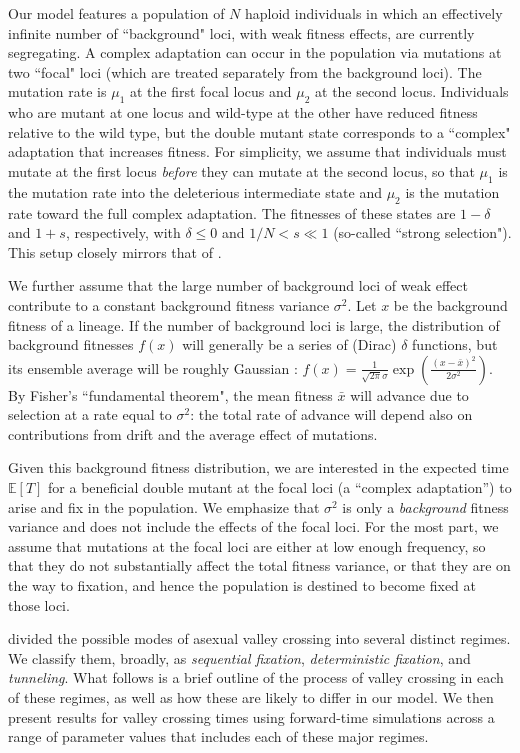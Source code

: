 \documentclass[10pt,twocolumn,twoside]{gsajnl}
\begin{document}
\begin{spacing}{1.5}
Our model features a population of $N$ haploid individuals in which an effectively infinite number of ``background" loci, with weak fitness effects, are currently segregating.
A complex adaptation can occur in the population via mutations at two ``focal" loci (which are treated separately from the background loci).
The mutation rate is $\mu_1$ at the first focal locus and $\mu_2$ at the second locus.
Individuals who are mutant at one locus and wild-type at the other have reduced fitness relative to the wild type, but the double mutant state corresponds to a ``complex" adaptation that increases fitness.
For simplicity, we assume that individuals must mutate at the first locus \emph{before} they can mutate at the second locus, so that $\mu_1$ is the mutation rate into the deleterious intermediate state and $\mu_2$ is the mutation rate toward the full complex adaptation.
The fitnesses of these states are $1-\delta$ and $1+s$, respectively, with $\delta \leq 0$ and $1/N < s \ll 1$ (so-called ``strong selection").
This setup closely mirrors that of \citep{weissman_2009}.

We further assume that the large number of background loci of weak effect contribute to a constant background fitness variance $\sigma^2$.
Let $x$ be the background fitness of a lineage.
If the number of background loci is large, the distribution of background fitnesses $f(x)$ will generally be a series of (Dirac) $\delta$ functions, but its ensemble average will be roughly Gaussian \citep{good_desai_2014}: $f(x) = \frac{1}{\sqrt{2\pi}\sigma} \exp (\frac{(x-\bar{x})^2}{2\sigma^2})$.
By Fisher's ``fundamental theorem", the mean fitness $\bar{x}$ will advance due to selection at a rate equal to $\sigma^2$: the total rate of advance will depend also on contributions from drift and the average effect of mutations.

Given this background fitness distribution, we are interested in the expected time $\mathbb{E}\left[ T\right]$ for a beneficial double mutant at the focal loci (a ``complex adaptation'') to arise and fix in the population.
We emphasize that $\sigma^2$ is only a \emph{background} fitness variance and does not include the effects of the focal loci.
For the most part, we assume that mutations at the focal loci are either at low enough frequency, so that they do not substantially affect the total fitness variance, or that they are on the way to fixation, and hence the population is destined to become fixed at those loci.

\citet{weissman_2009} divided the possible modes of asexual valley crossing into several distinct regimes.
We classify them, broadly, as \emph{sequential fixation}, \emph{deterministic fixation}, and \emph{tunneling}.
What follows is a brief outline of the process of valley crossing in each of these regimes, as well as how these are likely to differ in our model.
We then present results for valley crossing times using forward-time simulations across a range of parameter values that includes each of these major regimes.


\end{spacing}
\end{document}
